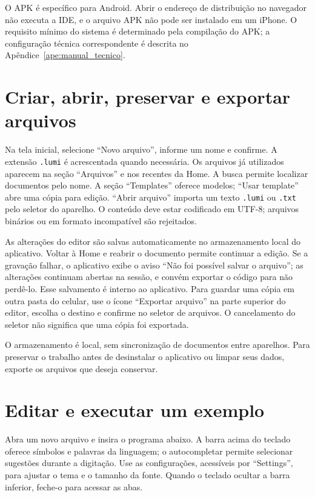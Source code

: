 O APK é específico para Android. Abrir o endereço de distribuição no navegador
não executa a IDE, e o arquivo APK não pode ser instalado em um iPhone. O requisito
mínimo do sistema é determinado pela compilação do APK; a configuração técnica
correspondente é descrita no Apêndice~\ref{ape:manual_tecnico}.

\section*{Criar, abrir, preservar e exportar arquivos}

Na tela inicial, selecione ``Novo arquivo'', informe um nome e confirme. A extensão
\texttt{.lumi} é acrescentada quando necessária. Os arquivos já utilizados aparecem
na seção ``Arquivos'' e nos recentes da Home. A busca permite localizar documentos
pelo nome. A seção ``Templates'' oferece modelos; ``Usar template'' abre uma cópia
para edição. ``Abrir arquivo'' importa um texto \texttt{.lumi} ou \texttt{.txt} pelo
seletor do aparelho. O conteúdo deve estar codificado em UTF-8; arquivos binários
ou em formato incompatível são rejeitados.

As alterações do editor são salvas automaticamente no armazenamento local do
aplicativo. Voltar à Home e reabrir o documento permite continuar a edição. Se a gravação falhar, o aplicativo exibe o aviso ``Não foi possível salvar o arquivo''; as alterações continuam abertas na sessão, e convém exportar o código para não perdê-lo. Esse salvamento é interno ao aplicativo. Para guardar uma cópia em outra pasta do celular, use o ícone ``Exportar arquivo'' na parte superior do editor, escolha o destino e confirme no seletor de arquivos.
O cancelamento do seletor não significa que uma cópia foi exportada.

O armazenamento é local, sem sincronização de documentos entre aparelhos. Para
preservar o trabalho antes de desinstalar o aplicativo ou limpar seus dados,
exporte os arquivos que deseja conservar.

\section*{Editar e executar um exemplo}

Abra um novo arquivo e insira o programa abaixo. A barra acima do teclado oferece
símbolos e palavras da linguagem; o autocompletar permite selecionar sugestões
durante a digitação. Use as configurações, acessíveis por ``Settings'', para
ajustar o tema e o tamanho da fonte. Quando o teclado ocultar a barra inferior,
feche-o para acessar as abas.

